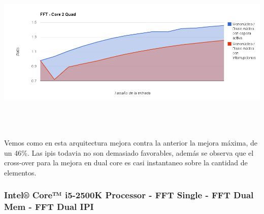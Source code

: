 \begin{center}
	    \includegraphics[height=8cm]{images/fft_core2quad.png}
	\end{center}

Vemos como en esta arquitectura mejora contra la anterior la mejora máxima, de un 46\%. Las ipis todavia no son demasiado favorables, además se observa que el cross-over para la mejora en dual core es casi instantaneo sobre la cantidad de elementos.

\subsubsection{Intel® Core™ i5-2500K Processor - FFT Single - FFT Dual Mem - FFT Dual IPI}

